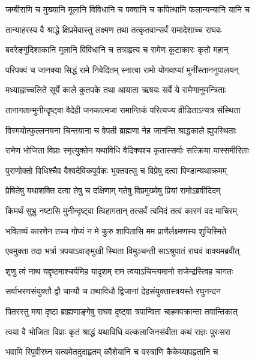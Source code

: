 \twolineshloka
{जम्बीराणि च मुख्यानि मूलानि विविधानि च}
{पक्वानि च कपित्थानि फलान्यन्यानि यानि च} %

\twolineshloka
{तान्याहरस्व वै श्राद्धे क्षिप्रमेवास्तु लक्ष्मण}
{तथा तत्कृतवान्सर्वं रामादेशाच्च राघवः} %

\twolineshloka
{बदरेङ्गुदिशाकानि मूलानि विविधानि च}
{तत्राहृत्य च रामेण कूटाकारः कृतो महान्} %

\twolineshloka
{परिपक्वं च जानक्या सिद्धं रामे निवेदितम्}
{स्नात्वा रामो योगवाप्यां मुनींस्ताननुपालयन्} %

\twolineshloka
{मध्याह्नाच्चलिते सूर्ये काले कुतपके तथा}
{आयाता ऋषयः सर्वे ये रामेणानुमन्त्रिताः} %

\twolineshloka
{तानागतान्मुनीन्दृष्ट्वा वैदेही जनकात्मजा}
{रामान्तिकं परित्यज्य व्रीडिताऽन्यत्र संस्थिता} %

\twolineshloka
{विस्मयोत्फुल्लनयना चिन्तयाना च वेपती}
{ब्राह्मणा नेह जानन्ति श्राद्धकाले ह्युपस्थिताः} %

\twolineshloka
{रामेण भोजिता विप्राः स्मृत्युक्तेन यथाविधि}
{वैदिक्यश्च कृतास्सर्वाः सत्क्रिया यास्समीरिताः} %

\twolineshloka
{पुराणोक्तो विधिश्चैव वैश्वदेविकपूर्वकः}
{भुक्तवत्सु च विप्रेषु दत्वा पिण्डान्यथाक्रमम्} %

\twolineshloka
{प्रेषितेषु यथाशक्ति दत्वा तेषु च दक्षिणाम्}
{गतेषु विप्रमुख्येषु प्रियां रामोऽब्रवीदिदम्} %

\twolineshloka
{किमर्थं सुभ्रु नष्टासि मुनीन्दृष्ट्वा त्विहागतान्}
{तत्सर्वं त्वमिदं तत्वं कारणं वद माचिरम्} %

\twolineshloka
{भवितव्यं कारणेन तच्च गोप्यं न मे कुरु}
{शापितासि मम प्राणैर्लक्ष्मणस्य शुचिस्मिते} %

\twolineshloka
{एवमुक्ता तदा भर्त्रा त्रपयाऽवाङ्मुखी स्थिता}
{विमुञ्चन्ती साऽश्रुपातं राघवं वाक्यमब्रवीत्} %

\twolineshloka
{शृणु त्वं नाथ यद्दृष्टमाश्चर्यमिह यादृशम्}
{राम त्वयाऽचिन्त्यमानो राजेन्द्रस्त्विह चागतः} %

\twolineshloka
{सर्वाभरणसंयुक्तौ द्वौ चान्यौ च तथाविधौ}
{द्विजानां देहसंयुक्तास्त्रयस्ते रघुनन्दन} %

\twolineshloka
{पितरस्तु मया दृष्टा ब्राह्मणाङ्गेषु राघव}
{दृष्ट्वा त्रपान्विता चाहमपक्रान्ता तवान्तिकात्} %

\twolineshloka
{त्वया वै भोजिता विप्राः कृतं श्राद्धं यथाविधि}
{वल्कलाजिनसंवीता कथं राज्ञः पुरःसरा} %

\twolineshloka
{भवामि रिपुवीरघ्न सत्यमेतदुदाहृतम्}
{कौशेयानि च वस्त्राणि कैकेय्यापहृतानि च} %

